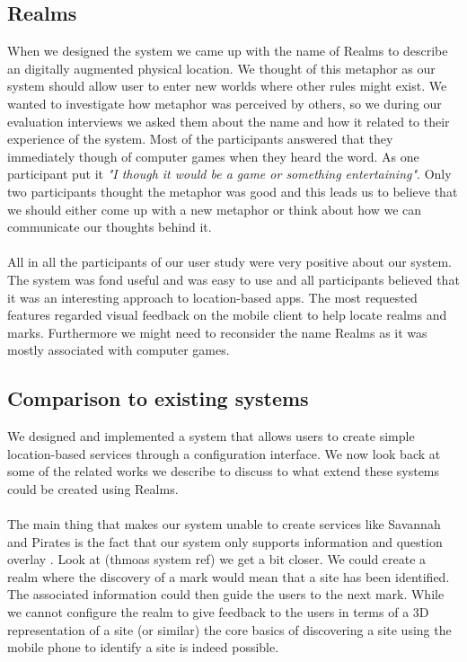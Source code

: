 \subsection{Realms} %
\label{sub:realms}
When we designed the system we came up with the name of Realms to describe an digitally augmented physical location. We thought of this metaphor as our system should allow user to enter new worlds where other rules might exist. We wanted to investigate how metaphor was perceived by others, so we during our evaluation interviews we asked them about the name and how it related to their experience of the system.
Most of the participants answered that they immediately though of computer games when they heard the word. As one participant put it \emph{"I though it would be a game or something entertaining"}. Only two participants thought the metaphor was good and this leads us to believe that we should either come up with a new metaphor or think about how we can communicate our thoughts behind it. 
\\\\
All in all the participants of our user study were very positive about our system. The system was fond useful and was easy to use and all participants believed that it was an interesting approach to location-based apps. The most requested features regarded visual feedback on the mobile client to help locate realms and marks. Furthermore we might need to reconsider the name Realms as it was mostly associated with computer games. 

\subsection{Comparison to existing systems} %
\label{sub:comparison_to_existing_systems}
We designed and implemented a system that allows users to create simple location-based services through a configuration interface. We now look back at some of the related works we describe to discuss to what extend these systems could be created using Realms.
\\\\
The main thing that makes our system unable to create services like Savannah and Pirates is the fact that our system only supports information and question overlay . Look at (thmoas system ref) we get a bit closer. We could create a realm where the discovery of a mark would mean that a site has been identified. The associated information could then guide the users to the next mark. While we cannot configure the realm to give feedback to the users in terms of a 3D representation of a site (or similar) the core basics of discovering a site using the mobile phone to identify a site is indeed possible.
